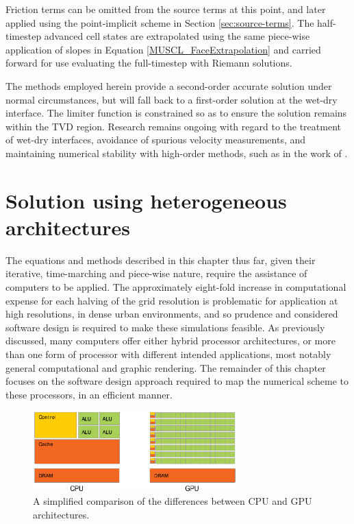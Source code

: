 Friction terms can be omitted from the source terms at this point, and later applied using the point-implicit scheme in Section \ref{sec:source-terms}. The half-timestep advanced cell states are extrapolated using the same piece-wise application of slopes in Equation \ref{MUSCL_FaceExtrapolation} and carried forward for use evaluating the full-timestep with Riemann solutions.

The methods employed herein provide a second-order accurate solution under normal circumstances, but will fall back to a first-order solution at the wet-dry interface. The limiter function is constrained so as to ensure the solution remains within the TVD region. Research remains ongoing with regard to the treatment of wet-dry interfaces, avoidance of spurious velocity measurements, and maintaining numerical stability with high-order methods, such as in the work of \citet{Hou2013}.

\section{Solution using heterogeneous architectures}

The equations and methods described in this chapter thus far, given their iterative, time-marching and piece-wise nature, require the assistance of computers to be applied. The approximately eight-fold increase in computational expense for each halving of the grid resolution is problematic for application at high resolutions, in dense urban environments, and so prudence and considered software design is required to make these simulations feasible. As previously discussed, many computers offer either hybrid processor architectures, or more than one form of processor with different intended applications, most notably general computational and graphic rendering. The remainder of this chapter focuses on the software design approach required to map the numerical scheme to these processors, in an efficient manner.

\begin{figure}[bp]
	\centering
	\includegraphics[width=0.7\textwidth]{numerical-scheme-figures/cpu-gpu-architecture.png}
	\caption{A simplified comparison of the differences between CPU and GPU architectures.}
	\label{CPUGPUArchitecture}
\end{figure}

